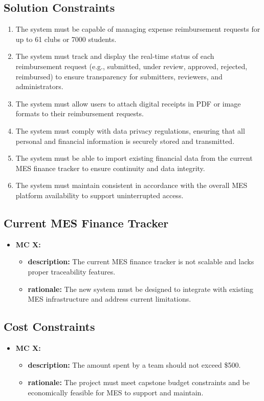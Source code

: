 \documentclass[12pt]{article}
\begin{document}
\subsection{Solution Constraints}
  \begin{enumerate}
    \item The system must be capable of managing expense reimbursement requests for up to 61 clubs or 7000 students.
    \item The system must track and display the real-time status of each reimbursement request (e.g., submitted, under review, approved, rejected, reimbursed) to ensure transparency for submitters, reviewers, and administrators.
    \item The system must allow users to attach digital receipts in PDF or image formats to their reimbursement requests.
    \item The system must comply with data privacy regulations, ensuring that all personal and financial information is securely stored and transmitted.
    \item The system must be able to import existing financial data from the current MES finance tracker to ensure continuity and data integrity.
    \item The system must maintain consistent in accordance with the overall MES platform availability to support uninterrupted access.
  \end{enumerate}

\subsection{Current MES Finance Tracker}
  \begin{itemize}
    \item \textbf{MC X:}
      \begin{itemize}[label=$\circ$]
        \item \textbf{description:} The current MES finance tracker is not scalable and lacks proper traceability features.
        \item \textbf{rationale:} The new system must be designed to integrate with existing MES infrastructure and address current limitations.
      \end{itemize}
  \end{itemize}

\subsection{Cost Constraints}
  \begin{itemize}
    \item \textbf{MC X:}
      \begin{itemize}[label=$\circ$]
        \item \textbf{description:} The amount spent by a team should not exceed \$500.
        \item \textbf{rationale:} The project must meet capstone budget constraints and be economically feasible for MES to support and maintain.
      \end{itemize}
  \end{itemize}
\end{document}
